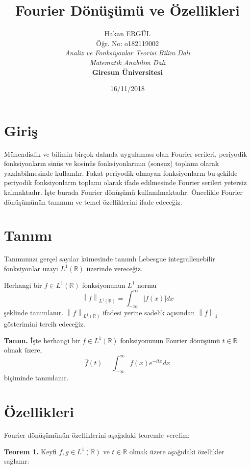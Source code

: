 \documentclass[a4paper, 9pt]{article}
\title{Fourier Dönüşümü ve Özellikleri}
\author{Hakan ERGÜL\\
Öğr. No: o182119002 \\
\textit{Analiz ve Fonksiyonlar Teorisi Bilim Dalı}\\
\textit{Matematik Anabilim Dalı}\\
\textbf{Giresun Üniversitesi}}
\date{16/11/2018}
\begin{document}
\maketitle

\section{Giriş}

Mühendislik ve bilimin birçok dalında uygulaması olan Fourier serileri, periyodik fonksiyonların sinüs ve kosinüs fonksiyonlarının (sonsuz) toplamı olarak yazılabilmesinde kullanılır. Fakat periyodik olmayan fonksiyonların bu şekilde periyodik fonksiyonların toplamı olarak ifade edilmesinde Fourier serileri yetersiz kalmaktadır. İşte burada Fourier dönüşümü kullanılmaktadır. Öncelikle Fourier dönüşümünün tanımını ve temel özelliklerini ifade edeceğiz.

\section{Tanımı}

Tanımımızı gerçel sayılar kümesinde tanımlı Lebesgue integrallenebilir fonksiyonlar uzayı $L^1(\mathbb{R})$ üzerinde vereceğiz.

Herhangi bir $f \in L^1(\mathbb{R})$ fonksiyonunun $L^1$ normu
\[\left \| f  \right \|_{ L^1(\mathbb{R})} = \int_{-\infty }^{\infty }\left | f(x) \right |dx\]
şeklinde tanımlanır. $ \left \| f  \right \|_{ L^1(\mathbb{R})}$  ifadesi yerine sadelik açısından $\left \| f  \right \|_1$ gösterimini tercih edeceğiz.

\textbf{Tanım.} İşte herhangi bir $f \in L^1(\mathbb{R})$ fonksiyonunun Fourier dönüşümü $t\in \mathbb{R}$ olmak üzere,
\[  \widehat{f}(t)=\int_{-\infty }^{\infty }f(x)e^{-itx}dx  \]
biçiminde tanımlanır.

\section{Özellikleri}

	Fourier dönüşümünün özelliklerini aşağıdaki teoremle verelim:

\textbf{Teorem 1.} Keyfi $f, g \in L^1(\mathbb{R})$ ve $t\in \mathbb{R}$ olmak üzere aşağıdaki özellikler sağlanır:
\end{document}

